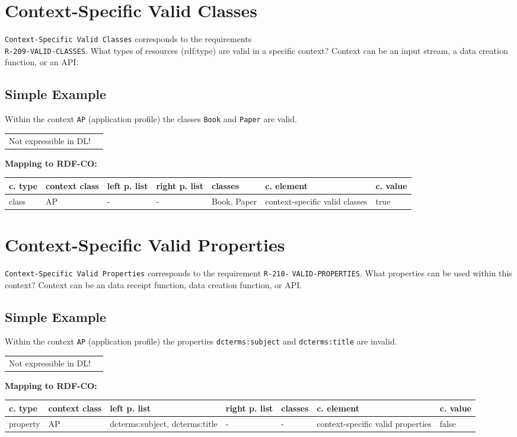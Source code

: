\documentclass{llncs}
\newcommand{\ms}[1]{\texttt{#1}}
\newenvironment{gcotable}{
  \scriptsize
  \sffamily
  \vspace{0cm}
	\begin{center}
	\textbf{\vspace{0.4cm}Mapping to RDF-CO:} \\
  \begin{tabular}{l|l|l|l|l|l|l}
	\hline
  \textbf{c. type} & \textbf{context class} & \textbf{left p. list} & \textbf{right p. list} & \textbf{classes} & \textbf{c. element} & \textbf{c. value} \\
  \hline

}{
  \hline
  \end{tabular}
	\end{center}
}
\newenvironment{DL}{
  \vspace{0cm}
	\begin{center}
  \begin{tabular}{r l}

}{
  \end{tabular}
	\end{center}
}
\begin{document}
\section{Context-Specific Valid Classes}

\ms{Context-Specific Valid Classes} corresponds to the requirements \\
\ms{R-209-VALID-CLASSES}.
What types of resources (rdf:type) are valid in a specific context? 
Context can be an input stream, a data creation function, or an API.

\subsection{Simple Example}

Within the context \ms{AP} (application profile) the classes \ms{Book} and \ms{Paper} are valid.

\begin{DL}
Not expressible in DL!
\end{DL}

\begin{gcotable}
class & AP & - & - & Book, Paper & context-specific valid classes & true \\
\end{gcotable}

\section{Context-Specific Valid Properties}

\ms{Context-Specific Valid Properties} corresponds to the requirement
\ms{R-210-} \ms{VALID-PROPERTIES}.
What properties can be used within this context? 
Context can be an data receipt function, data creation function, or API.

\subsection{Simple Example}

Within the context \ms{AP} (application profile) the properties \ms{dcterms:subject} and \ms{dcterms:title} are invalid.

\begin{DL}
Not expressible in DL!
\end{DL}

\begin{gcotable}
property & AP & dcterms:subject, dcterms:title & - & - & context-specific valid properties & false \\
\end{gcotable}
\end{document}
